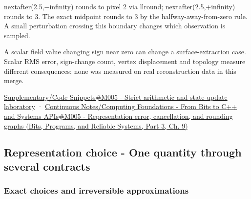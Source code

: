 \hypertarget{appendix-92ff77d4dfdc-discrete-decisions}{}

nextafter(2.5,−infinity) rounds to pixel 2 via llround; nextafter(2.5,+infinity) rounds to 3. The exact midpoint rounds to 3 by the halfway-away-from-zero rule. A small perturbation crossing this boundary changes which observation is sampled.

A scalar field value changing sign near zero can change a surface-extraction case. Scalar RMS error, sign-change count, vertex displacement and topology measure different consequences; none was measured on real reconstruction data in this merge.

\hyperref[appendix-4e2236f53445-m005---strict-arithmetic-and-state-update-laboratory]{Supplementary/Code Snippets\#M005 - Strict arithmetic and state-update laboratory} · \href{../01-Bits-Programs-and-Reliable-Systems-P03/main.pdf\#nameddest=01-foundations-i-ch011-m005---representation-error-cancellation-and-rounding-graphs}{Continuous Notes/Computing Foundations - From Bits to C++ and Systems APIs\#M005 - Representation error, cancellation, and rounding graphs (Bits, Programs, and Reliable Systems, Part 3, Ch. 9)}

\subsection{Representation choice - One quantity through several contracts}\label{appendix-92ff77d4dfdc-representation-choice---one-quantity-through-several-contracts}

\hypertarget{appendix-92ff77d4dfdc-representation-choice---one-quantity-through-several-contracts}{}

\subsubsection{Exact choices and irreversible approximations}\label{appendix-92ff77d4dfdc-exact-choices-and-irreversible-approximations}

\hypertarget{appendix-92ff77d4dfdc-exact-choices-and-irreversible-approximations}{}

